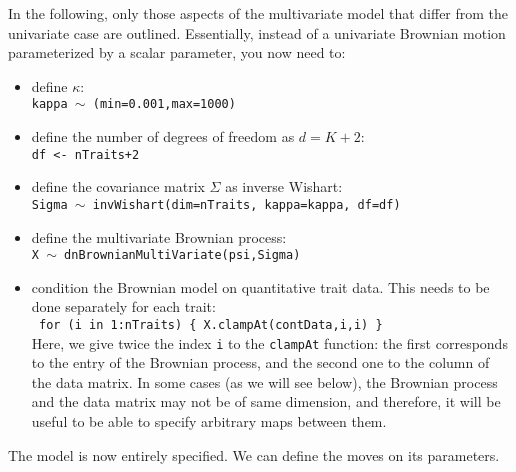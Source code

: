 \documentclass[usletter]{article}
\newcommand{\cmd}[1]{\texttt{#1}}
\begin{document}
In the following, only those aspects of the multivariate model that differ from the univariate case are outlined.
Essentially, instead of a univariate Brownian motion parameterized by a scalar parameter, you now need to:
\begin{itemize}
\item
define $\kappa$:
\\
\cmd{kappa $\sim$ (min=0.001,max=1000)}
\item
define the number of degrees of freedom as $d = K+2$:
\\
\cmd{df <- nTraits+2}
\item
define the covariance matrix $\Sigma$ as inverse Wishart:
\\
\cmd{Sigma $\sim$ invWishart(dim=nTraits, kappa=kappa, df=df)}
\item
define the multivariate Brownian process:
\\
\cmd{X $\sim$ dnBrownianMultiVariate(psi,Sigma)}
\item
condition the Brownian model on quantitative trait data.
This needs to be done separately for each trait:
\\
\cmd{
for (i in 1:nTraits)    \{
        X.clampAt(contData,i,i)
\}
}
\\
Here, we give twice the index \cmd{i} to the \cmd{clampAt} function: the first corresponds to the entry of the Brownian process, and the second one to the column of the data matrix. In some cases (as we will see below), the Brownian process and the data matrix may not be of same dimension, and therefore, it will be useful to be able to specify arbitrary maps between them.
\end{itemize}
The model is now entirely specified. We can define the moves on its parameters.
\end{document}
